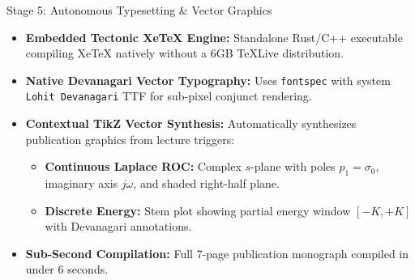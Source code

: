 \documentclass[aspectratio=169,10pt]{beamer}
\begin{document}
\begin{frame}{Stage 5: Autonomous Typesetting \& Vector Graphics}
  \begin{itemize}
    \item \textbf{Embedded Tectonic XeTeX Engine:} Standalone Rust/C++ executable compiling XeTeX natively without a 6GB TeXLive distribution.
    \item \textbf{Native Devanagari Vector Typography:} Uses \texttt{fontspec} with system \texttt{Lohit Devanagari} TTF for sub-pixel conjunct rendering.
    \item \textbf{Contextual TikZ Vector Synthesis:} Automatically synthesizes publication graphics from lecture triggers:
    \begin{itemize}
      \footnotesize
      \item \textbf{Continuous Laplace ROC:} Complex $s$-plane with poles $p_1 = \sigma_0$, imaginary axis $j\omega$, and shaded right-half plane.
      \item \textbf{Discrete Energy:} Stem plot showing partial energy window $[-K, +K]$ with Devanagari annotations.
    \end{itemize}
    \item \textbf{Sub-Second Compilation:} Full 7-page publication monograph compiled in under 6 seconds.
  \end{itemize}
\end{frame}
\end{document}

